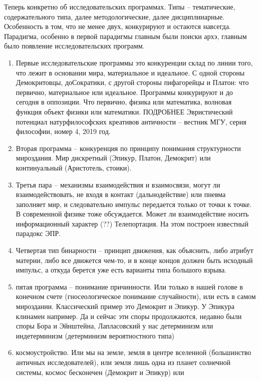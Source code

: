 \documentclass[a4paper, 12pt]{article}
\begin{document}
Теперь конкретно об исследовательских программах. Типы -- тематические, 
содержательного типа, далее методологические, далее дисциплинарные. 
Особенность в том, что не менее двух, конкурируют и остаются навсегда. 
Парадигма, особенно в первой парадигмы главным были поиски архэ, главным 
было появление исследовательских программ.
\begin{enumerate}
  \item Первые исследовательские программы это конкуренции склад по 
    линии того, что лежит в основании мира, материальное и идеальное. 
    С одной стороны Демокритовцы, доСократики, с другой стороны 
    пифагорейцы и Платон: что первично, материальное или идеальное. 
    Программы конкурируют и до сегодня в оппозиции. Что первично, физика 
    или математика, волновая функция объект физики или математики. 
    ПОДРОБНЕЕ Эвристический потенциал натурфилософских креативов 
    античности -- вестник МГУ, серия философии, номер 4, 2019 год.
  \item Вторая программа -- конкуренция по принципу понимания 
    структурности мироздания. Мир дискретный (Эпикур, Платон, Демокрит) 
    или континуальный (Аристотель, стоики).
  \item Третья пара -- механизмы взаимодействия и взаимосвязи, могут ли 
    взаимодействовать, не входя в контакт (дальнодействие) или пневма 
    заполняет мир, и следовательно импульс передается только от точки 
    к точке. В современной физике тоже обсуждается. Может ли 
    взаимодействие носить информационный характер (??) Телепортация. На 
    этом построен известный парадокс ЭПР.
  \item Четвертая тип бинарности -- принцип движения, как объяснить, 
    либо атрибут материи, либо все движется чем-то, и в конце концов 
    должен быть исходный импульс, а откуда берется уже есть варианты 
    типа большого взрыва.
  \item пятая программа -- понимание причинности. Или только в нашей 
    голове в конечном счете (гносеологическое понимание случайности), 
    или есть в самом мироздании. Классический пример это Демокрит 
    и Эпикур. У Эпикура клинамен например. Да и сейчас эти споры 
    продолжаются, недавно были споры Бора и Эйнштейна, Лапласовский 
    у нас детерминизм или индетерминизм (детерминизм вероятностного 
    типа)
  \item космоустройство. Или мы на земле, земля в центре вселенной 
    (большинство античных исследователей), или земля лишь одна из планет 
    солнечной системы, космос бесконечен (Демокрит и Эпикур) или 

\end{enumerate}
\end{document}
